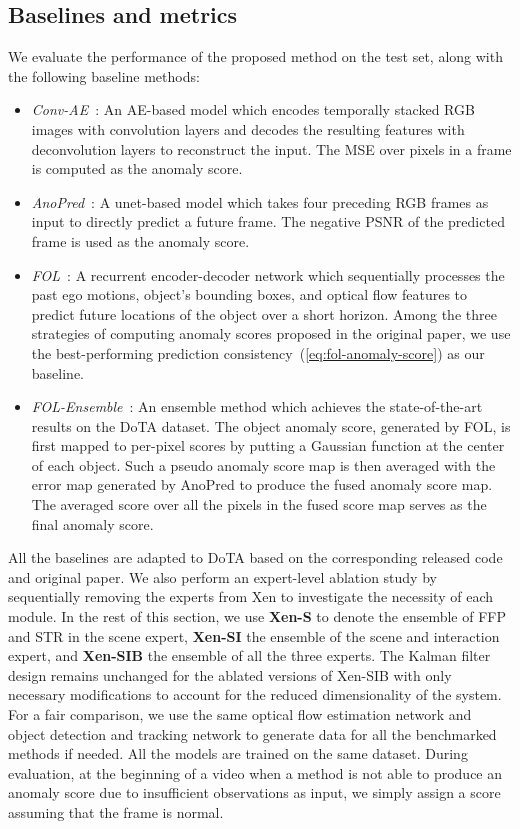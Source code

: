 \subsection{Baselines and metrics}
We evaluate the performance of the proposed method on the test set, along with the following baseline methods:
\begin{itemize}
\item
\textit{Conv-AE}~\citep{hasan2016learning}: An AE-based model which encodes temporally stacked RGB images with convolution layers and decodes the resulting features with deconvolution layers to reconstruct the input. The MSE over pixels in a frame is computed as the anomaly score.
\item
\textit{AnoPred}~\citep{liu2018future}: A unet-based model which takes four preceding RGB frames as input to directly predict a future frame. The negative PSNR of the predicted frame is used as the anomaly score.
\item
\textit{FOL}~\citep{yao2019unsupervised}: A recurrent encoder-decoder network which sequentially processes the past ego motions, object's bounding boxes, and optical flow features to predict future locations of the object over a short horizon. Among the three strategies of computing anomaly scores proposed in the original paper, we use the best-performing prediction consistency~(\ref{eq:fol-anomaly-score}) as our baseline.
\item
\textit{FOL-Ensemble}~\citep{yao2022dota}: An ensemble method which achieves the state-of-the-art results on the DoTA dataset. The object anomaly score, generated by FOL, is first mapped to per-pixel scores by putting a Gaussian function at the center of each object. Such a pseudo anomaly score map is then averaged with the error map generated by AnoPred to produce the fused anomaly score map. The averaged score over all the pixels in the fused score map serves as the final anomaly score.
\end{itemize}

All the baselines are adapted to DoTA based on the corresponding released code and original paper. We also perform an expert-level ablation study by sequentially removing the experts from Xen to investigate the necessity of each module. In the rest of this section, we use \textbf{Xen-S} to denote the ensemble of FFP and STR in the scene expert, \textbf{Xen-SI} the ensemble of the scene and interaction expert, and \textbf{Xen-SIB} the ensemble of all the three experts. The Kalman filter design remains unchanged for the ablated versions of Xen-SIB with only necessary modifications to account for the reduced dimensionality of the system. For a fair comparison, we use the same optical flow estimation network and object detection and tracking network to generate data for all the benchmarked methods if needed. All the models are trained on the same dataset. During evaluation, at the beginning of a video when a method is not able to produce an anomaly score due to insufficient observations as input, we simply assign a score assuming that the frame is normal.


